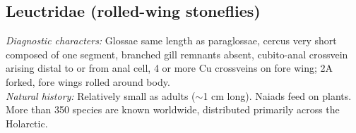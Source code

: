 \documentclass[letterpaper, 11pt]{article}
\begin{document}
\subsection{Leuctridae (rolled-wing stoneflies)}%
\noindent{}\textit{Diagnostic characters:} Glossae same length as paraglossae, cercus very short composed of one segment, branched gill remnants absent, cubito-anal crossvein arising distal to or from anal cell, 4 or more Cu crossveins on fore wing; 2A forked, fore wings rolled around body.\\

\noindent{}\textit{Natural history:} Relatively small as adults ($\sim$1 cm long). Naiads feed on plants. More than 350 species are known worldwide, distributed primarily across the Holarctic.\\
\end{document}
